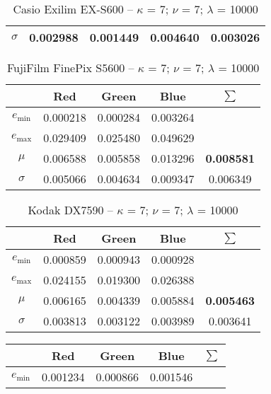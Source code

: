 \begin{appendix}
\begin{table}[htb]
\begin{tabular}{|c||c|c|c|c|}
      $\sigma$       & 0.002988 & 0.001449 & 0.004640 & 0.003026 \\\hline
    \end{tabular}
  \caption{Casio Exilim EX-S600 -- $\kappa$ = 7; $\nu$ = 7; $\lambda$ = 10000}
  \label{tab:Casio Exilim EX-S6007710000}
\end{table}
\begin{table}[htb]
  \centering
    \begin{tabular}{|c||c|c|c|c|}\hline
		   & \textbf{Red} & \textbf{Green} & \textbf{Blue} & \textbf{$\sum$} \\\hline\hline
      $e_\text{min}$ & 0.000218 & 0.000284 & 0.003264 &   \\\hline
      $e_\text{max}$ & 0.029409 & 0.025480 & 0.049629 &   \\\hline
      $\mu$          & 0.006588 & 0.005858 & 0.013296 & \textbf{0.008581} \\\hline
      $\sigma$       & 0.005066 & 0.004634 & 0.009347 & 0.006349 \\\hline
    \end{tabular}
  \caption{FujiFilm FinePix S5600 -- $\kappa$ = 7; $\nu$ = 7; $\lambda$ = 10000}
  \label{tab:FujiFilm FinePix S56007710000}
\end{table}
\begin{table}[htb]
  \centering
    \begin{tabular}{|c||c|c|c|c|}\hline
		   & \textbf{Red} & \textbf{Green} & \textbf{Blue} & \textbf{$\sum$} \\\hline\hline
      $e_\text{min}$ & 0.000859 & 0.000943 & 0.000928 &   \\\hline
      $e_\text{max}$ & 0.024155 & 0.019300 & 0.026388 &   \\\hline
      $\mu$          & 0.006165 & 0.004339 & 0.005884 & \textbf{0.005463} \\\hline
      $\sigma$       & 0.003813 & 0.003122 & 0.003989 & 0.003641 \\\hline
    \end{tabular}
  \caption{Kodak DX7590 -- $\kappa$ = 7; $\nu$ = 7; $\lambda$ = 10000}
  \label{tab:Kodak DX75907710000}
\end{table}
\begin{table}[htb]
  \centering
    \begin{tabular}{|c||c|c|c|c|}\hline
		   & \textbf{Red} & \textbf{Green} & \textbf{Blue} & \textbf{$\sum$} \\\hline\hline
      $e_\text{min}$ & 0.001234 & 0.000866 & 0.001546 &   \\\hline

\end{tabular}
\end{table}
\end{appendix}
